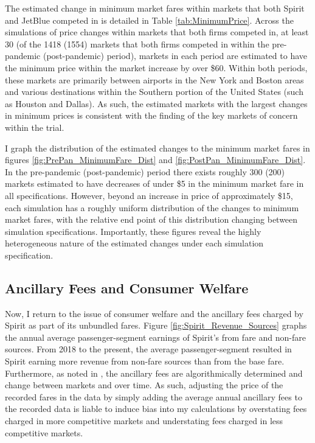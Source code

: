 \documentclass{article}
\begin{document}
     The estimated change in minimum market fares within markets that both Spirit and JetBlue competed in is detailed in Table \ref{tab:MinimumPrice}. Across the simulations of price changes within markets that both firms competed in, at least 30 (of the 1418 (1554) markets that both firms competed in within the pre-pandemic (post-pandemic) period), markets in each period are estimated to have the minimum price within the market increase by over \$60. Within both periods, these markets are primarily between airports in the New York and Boston areas and various destinations within the Southern portion of the United States (such as Houston and Dallas). As such, the estimated markets with the largest changes in minimum prices is consistent with the finding of the key markets of concern within the trial. 

    I graph the distribution of the estimated changes to the minimum market fares in figures \ref{fig:PrePan_MinimumFare_Dist} and \ref{fig:PostPan_MinimumFare_Dist}. In the pre-pandemic (post-pandemic) period there exists roughly 300 (200) markets estimated to have decreases of under \$5 in the minimum market fare in all specifications. However, beyond an increase in price of approximately \$15, each simulation has a roughly uniform distribution of the changes to minimum market fares, with the relative end point of this distribution changing between simulation specifications. Importantly, these figures reveal the highly heterogeneous nature of the estimated changes under each simulation specification.

    \subsection{Ancillary Fees and Consumer Welfare}

    Now, I return to the issue of consumer welfare and the ancillary fees charged by Spirit as part of its unbundled fares. Figure \ref{fig:Spirit_Revenue_Sources} graphs the annual average passenger-segment earnings of Spirit's from fare and non-fare sources. From 2018 to the present, the average passenger-segment resulted in Spirit earning more revenue from non-fare sources than from the base fare. Furthermore, as noted in \citep{senate_permanent_committee_on_investigations_majority_2024}, the ancillary fees are algorithmically determined and change between markets and over time. As such, adjusting the price of the recorded fares in the data by simply adding the average annual ancillary fees to the recorded data is liable to induce bias into my calculations by overstating fees charged in more competitive markets and understating fees charged in less competitive markets. 
\end{document}

